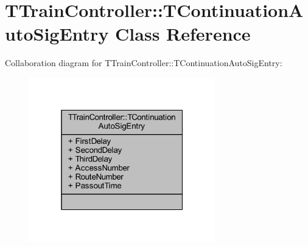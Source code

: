 \hypertarget{class_t_train_controller_1_1_t_continuation_auto_sig_entry}{}\section{T\+Train\+Controller\+:\+:T\+Continuation\+Auto\+Sig\+Entry Class Reference}
\label{class_t_train_controller_1_1_t_continuation_auto_sig_entry}


Collaboration diagram for T\+Train\+Controller\+:\+:T\+Continuation\+Auto\+Sig\+Entry\+:\nopagebreak
\begin{figure}[H]
\begin{center}
\leavevmode
\includegraphics[width=229pt]{class_t_train_controller_1_1_t_continuation_auto_sig_entry__coll__graph}
\end{center}
\end{figure}
